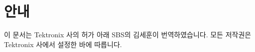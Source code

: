 \documentclass[10pt,twocolumn,a4paper]{book}
\begin{document}

\thispagestyle{empty}

\restoregeometry
\tableofcontents

\onecolumn
\section{안내}
이 문서는 Tektronix 사의 허가 아래 SBS의 김세훈이 번역하였습니다. 모든 저작권은 Tektronix 사에서 설정한 바에 따릅니다.

\twocolumn





















\printindex
\end{document}
